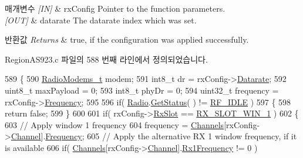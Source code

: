 \begin{DoxyParams}{매개변수}
{\em \mbox{[}\+I\+N\mbox{]}} & rx\+Config Pointer to the function parameters.\\
\hline
{\em \mbox{[}\+O\+U\+T\mbox{]}} & datarate The datarate index which was set.\\
\hline
\end{DoxyParams}

\begin{DoxyRetVals}{반환값}
{\em Returns} & true, if the configuration was applied successfully. \\
\hline
\end{DoxyRetVals}


Region\+A\+S923.\+c 파일의 588 번째 라인에서 정의되었습니다.


\begin{DoxyCode}
589 \{
590     \mbox{\hyperlink{radio_8h_a992ef7a5b7f52975ba7bd8dd97740057}{RadioModems\_t}} modem;
591     int8\_t dr = rxConfig->\mbox{\hyperlink{structs_rx_config_params_ae2f6080f3aa0e9485c55513ca56bb24d}{Datarate}};
592     uint8\_t maxPayload = 0;
593     int8\_t phyDr = 0;
594     uint32\_t frequency = rxConfig->\mbox{\hyperlink{structs_rx_config_params_ade3d190636488dad9a89b19446b7acf1}{Frequency}};
595 
596     \textcolor{keywordflow}{if}( \mbox{\hyperlink{sx1276mb1las_8c_acf9fe61a72c16fa29a0dc449d23e3820}{Radio}}.\mbox{\hyperlink{struct_radio__s_a8d469520cd62ec3004a50fcaa31d8c72}{GetStatus}}( ) != \mbox{\hyperlink{radio_8h_a2f3fa4ad0237c4ace94aa99086aac9f5a89c1ff89fc074c1c80f96d186c99f899}{RF\_IDLE}} )
597     \{
598         \textcolor{keywordflow}{return} \textcolor{keyword}{false};
599     \}
600 
601     \textcolor{keywordflow}{if}( rxConfig->\mbox{\hyperlink{structs_rx_config_params_a0a258bf8cfad5219bfd579257e523fc1}{RxSlot}} == \mbox{\hyperlink{group___l_o_r_a_m_a_c_gga933a5a2f7d57b1a5cb22f061e30558fea5fa7051b96e31f50660867ec02cb6624}{RX\_SLOT\_WIN\_1}} )
602     \{
603         \textcolor{comment}{// Apply window 1 frequency}
604         frequency = \mbox{\hyperlink{_region_a_s923_8c_a02bae2504563543865d6b0e81c48ab61}{Channels}}[rxConfig->\mbox{\hyperlink{structs_rx_config_params_a1ca6f01ca18afe402de51babe8c95f5e}{Channel}}].\mbox{\hyperlink{structs_channel_params_ade3d190636488dad9a89b19446b7acf1}{Frequency}};
605         \textcolor{comment}{// Apply the alternative RX 1 window frequency, if it is available}
606         \textcolor{keywordflow}{if}( \mbox{\hyperlink{_region_a_s923_8c_a02bae2504563543865d6b0e81c48ab61}{Channels}}[rxConfig->\mbox{\hyperlink{structs_rx_config_params_a1ca6f01ca18afe402de51babe8c95f5e}{Channel}}].\mbox{\hyperlink{structs_channel_params_a8a564b8635b12d5f0f348ae177dd92e1}{Rx1Frequency}} != 0 )

\end{DoxyCode}
